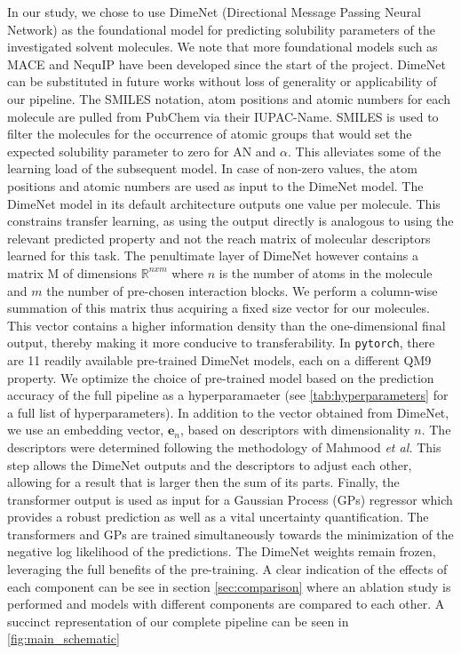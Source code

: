 \documentclass[
  english,        %
  font=times,     %
  onecolumn,      %
]{article}
\begin{document}
In our study, we chose to use DimeNet (Directional Message Passing Neural Network) \cite{dimenet} as the foundational model for predicting solubility parameters of the investigated solvent molecules. We note that more foundational models such as MACE\cite{MACE} and NequIP\cite{batzner20223} have been developed since the start of the project. DimeNet can be substituted in future works without loss of generality or applicability of our pipeline. The SMILES notation, atom positions and atomic numbers for each molecule are pulled from PubChem via their IUPAC-Name. SMILES is used to filter the molecules for the occurrence of atomic groups that would set the expected solubility parameter to zero\cite{mathieuPencilPaperEstimation2018,gutmannEmpiricalParametersDonor1976,schmeisserGutmannDonorAcceptor2012,burkeSolubilityParametersTheory1984} for AN and $\alpha$. This alleviates some of the learning load of the subsequent model. In case of non-zero values, the atom positions and atomic numbers are used as input to the DimeNet model. The DimeNet model in its default architecture outputs one value per molecule. This constrains transfer learning, as using the output directly is analogous to using the relevant predicted property and not the reach matrix of molecular descriptors learned for this task.  The penultimate layer of DimeNet however contains a matrix M of dimensions $\mathbb{R}^{nxm}$ where $n$ is the number of atoms in the molecule and $m$ the number of pre-chosen interaction blocks. We perform a column-wise summation of this matrix thus acquiring a fixed size  vector for our molecules. This vector contains a higher information density than the one-dimensional final output, thereby making it  more conducive to transferability. In \texttt{pytorch}, there are 11 readily available pre-trained DimeNet models, each on a different QM9 property. We optimize the choice of pre-trained model based on the prediction accuracy of the full pipeline as a hyperparamaeter (see \cref{tab:hyperparameters} for a full list of hyperparameters). In addition to the vector obtained from DimeNet, we use an embedding vector, $\mathbf{e}_n$, based on descriptors with dimensionality $n$. The descriptors were determined following the methodology of Mahmood \textit{et al.} \cite{mahmood2023easy}
This step allows the DimeNet outputs and the descriptors to adjust each other, allowing for a result that is larger then the sum of its parts. Finally, the transformer output is used as input for a Gaussian Process (GPs) regressor which provides a robust prediction as well as a vital uncertainty quantification.  The transformers and GPs are trained simultaneously towards the minimization of the negative log likelihood of the predictions. The DimeNet weights remain frozen, leveraging the full benefits of the pre-training. A clear indication of the effects of each component can be see in section \cref{sec:comparison} where an ablation study is performed and models with different components are compared to each other.  A succinct representation of our complete pipeline can be seen in \cref{fig:main_schematic}
\end{document}
